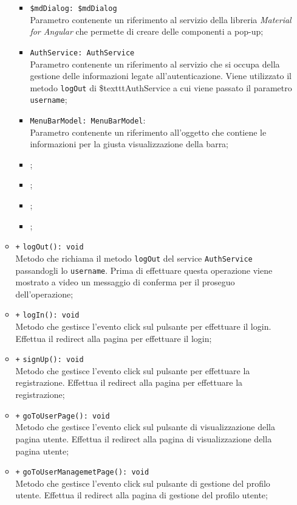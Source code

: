 \begin{itemize}
\begin{itemize}
\begin{itemize}
			\item \texttt{\$mdDialog: \$mdDialog} \\
			Parametro contenente un riferimento al servizio della libreria \textit{Material for Angular} che permette di creare delle componenti a pop-up;
			\item \texttt{AuthService: AuthService} \\
			Parametro contenente un riferimento al servizio che si occupa della gestione delle informazioni legate all'autenticazione.  Viene utilizzato il metodo \texttt{logOut} di \$texttt{AuthService} a cui viene passato il parametro \texttt{username};
			\item \texttt{MenuBarModel: MenuBarModel}: \\
			Parametro contenente un riferimento all'oggetto che contiene le informazioni per la giusta visualizzazione della barra;
			\item \rootscopeP;
			\item \errorinfomodelP;
			\item \userdetailsmodelP;
			\item \mdBottomSheetP;
		\end{itemize}
		\item \texttt{+} \texttt{logOut(): void} \\
		Metodo che richiama il metodo \texttt{logOut} del service \texttt{AuthService} passandogli lo \texttt{username}. Prima di effettuare questa operazione viene mostrato a video un messaggio di conferma per il proseguo dell'operazione; 
		\item \texttt{+} \texttt{logIn(): void} \\
		Metodo che gestisce l'evento click sul pulsante per effettuare il login. Effettua il redirect alla pagina per effettuare il login; 
		\item \texttt{+} \texttt{signUp(): void} \\
		Metodo che gestisce l'evento click sul pulsante per effettuare la registrazione. Effettua il redirect alla pagina per effettuare la registrazione; 
		\item \texttt{+} \texttt{goToUserPage(): void} \\
		Metodo che gestisce l'evento click sul pulsante di visualizzazione della pagina utente. Effettua il redirect alla pagina di visualizzazione della pagina utente; 
		\item \texttt{+} \texttt{goToUserManagemetPage(): void} \\
		Metodo che gestisce l'evento click sul pulsante di gestione del profilo utente. Effettua il redirect alla pagina di gestione del profilo utente; 

\end{itemize}
\end{itemize}
